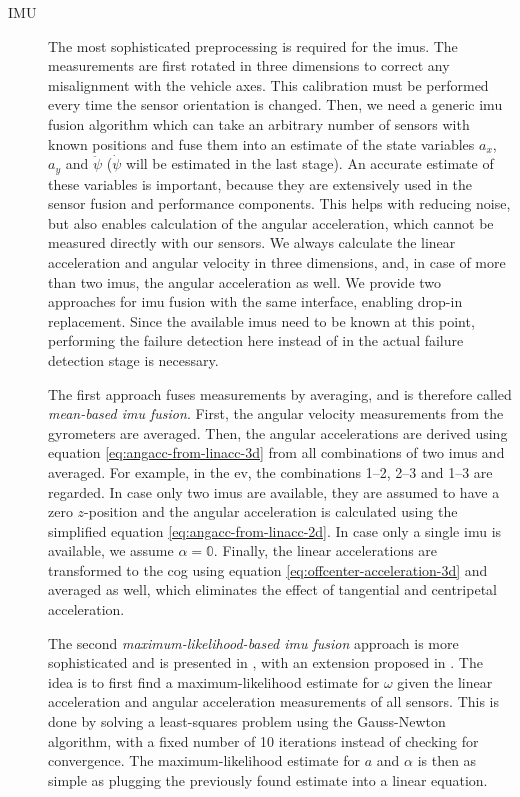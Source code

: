 \begin{description}
\item[IMU] The most sophisticated preprocessing is required for the \glspl{imu}. The measurements are first rotated in three dimensions to correct any misalignment with the vehicle axes. This calibration must be performed every time the sensor orientation is changed. Then, we need a generic \gls{imu} fusion algorithm which can take an arbitrary number of sensors with known positions and fuse them into an estimate of the state variables $a_x$, $a_y$ and $\ddot{\psi}$ ($\dot{\psi}$ will be estimated in the last stage). An accurate estimate of these variables is important, because they are extensively used in the sensor fusion and performance components. This helps with reducing noise, but also enables calculation of the angular acceleration, which cannot be measured directly with our sensors. We always calculate the linear acceleration and angular velocity in three dimensions, and, in case of more than two \glspl{imu}, the angular acceleration as well. We provide two approaches for \gls{imu} fusion with the same interface, enabling drop-in replacement. Since the available \glspl{imu} need to be known at this point, performing the failure detection here instead of in the actual failure detection stage is necessary.

The first approach fuses measurements by averaging, and is therefore called \textit{mean-based \gls{imu} fusion}. First, the angular velocity measurements from the gyrometers are averaged. Then, the angular accelerations are derived using equation \ref{eq:angacc-from-linacc-3d} from all combinations of two \glspl{imu} and averaged. For example, in the \gls{ev}, the combinations 1--2, 2--3 and 1--3 are regarded. In case only two \glspl{imu} are available, they are assumed to have a zero $z$-position and the angular acceleration is calculated using the simplified equation \ref{eq:angacc-from-linacc-2d}. In case only a single \gls{imu} is available, we assume $\alpha = \mathbb{0}$. Finally, the linear accelerations are transformed to the \gls{cog} using equation \ref{eq:offcenter-acceleration-3d} and averaged as well, which eliminates the effect of tangential and centripetal acceleration.

The second \textit{maximum-likelihood-based \gls{imu} fusion} approach is more sophisticated and is presented in \cite{Skog.2016}, with an extension proposed in \cite{Wahlstrom.2018}. The idea is to first find a maximum-likelihood estimate for $\omega$ given the linear acceleration and angular acceleration measurements of all sensors. This is done by solving a least-squares problem using the Gauss-Newton algorithm, with a fixed number of 10 iterations instead of checking for convergence. The maximum-likelihood estimate for $a$ and $\alpha$ is then as simple as plugging the previously found estimate into a linear equation.


\end{description}
